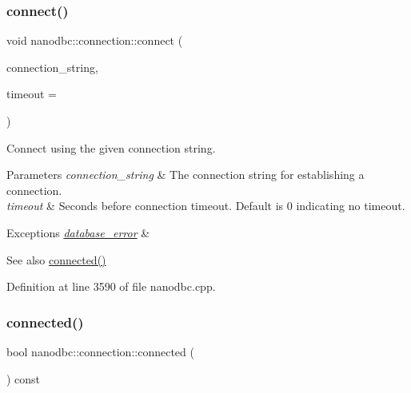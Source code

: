\subsubsection{\texorpdfstring{connect()}{connect()}\hspace{0.1cm}{\footnotesize\ttfamily [2/2]}}
{\footnotesize\ttfamily void nanodbc\+::connection\+::connect (\begin{DoxyParamCaption}\item[{const \mbox{\hyperlink{namespacenanodbc_abfc0ece56278e590911ec8352774c212}{string}} \&}]{connection\+\_\+string,  }\item[{long}]{timeout = {} }\end{DoxyParamCaption})}



Connect using the given connection string. 


\begin{DoxyParams}{Parameters}
{\em connection\+\_\+string} & The connection string for establishing a connection. \\
\hline
{\em timeout} & Seconds before connection timeout. Default is 0 indicating no timeout. \\
\hline
\end{DoxyParams}

\begin{DoxyExceptions}{Exceptions}
{\em \mbox{\hyperlink{classnanodbc_1_1database__error}{database\+\_\+error}}} & \\
\hline
\end{DoxyExceptions}
\begin{DoxySeeAlso}{See also}
\mbox{\hyperlink{classnanodbc_1_1connection_a703da57a7ce3c572f472132ba49a1114}{connected()}} 
\end{DoxySeeAlso}


Definition at line 3590 of file nanodbc.\+cpp.

\mbox{\label{classnanodbc_1_1connection_a703da57a7ce3c572f472132ba49a1114}} 
\subsubsection{\texorpdfstring{connected()}{connected()}}
{\footnotesize\ttfamily bool nanodbc\+::connection\+::connected (\begin{DoxyParamCaption}{ }\end{DoxyParamCaption}) const}



